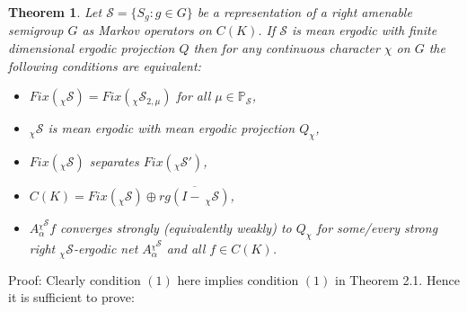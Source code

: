\documentclass{amsart}
\newtheorem{thm}{Theorem}[section]
\theoremstyle{definition}
\theoremstyle{remark}
\numberwithin{equation}{section}
\begin{document}
\begin{thm}
Let $\mathcal{S} = \{ S_g : g\in G \}$ be a
representation of a right amenable semigroup $G$ as Markov operators on
$C(K)$. If $\mathcal{S}$ is mean ergodic with finite dimensional
ergodic projection $Q$ then for any continuous character $\chi $ on $G$
the following conditions are equivalent:
\begin{itemize}
\item[(1)] $Fix(_{\chi}\mathcal{S}) = Fix(_{\chi}\mathcal{S}_{2,\mu})$ for all
$\mu \in \mathbb{P}_{\mathcal{S}}$,
\item[(2)] $_{\chi}\mathcal{S}$ is mean ergodic with mean ergodic projection $Q_{\chi}$,
\item[(3)] $Fix(\mathcal{_{\chi}S})$ separates $Fix(_{\chi}\mathcal{S}')$,
\item[(3)] $C(K) = Fix(_{\chi}\mathcal{S})\oplus \overline{rg(I - \  _{\chi}\mathcal{S})} $,
\item[(4)] $A_{\alpha}^{_{\chi}\mathcal{S}}f$ converges strongly (equivalently weakly) to
$Q_{\chi }$ for some/every strong right $_{\chi}\mathcal{S}$-ergodic net
$A_{\alpha}^{_{\chi}\mathcal{S}}$ and all $f\in C(K)$.
\end{itemize}
\end{thm}
Proof: Clearly condition $(1)$ here implies condition $(1)$ in Theorem 2.1.
Hence it is sufficient to prove:
\end{document}
